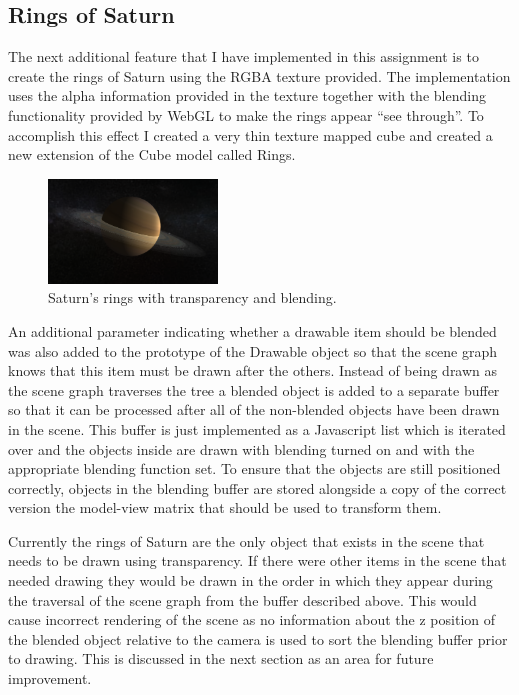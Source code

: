 \documentclass[conference]{IEEEtran}
\begin{document}
\subsection{Rings of Saturn}
The next additional feature that I have implemented in this assignment is to create the rings of Saturn using the RGBA texture provided. The implementation uses the alpha information provided in the texture together with the blending functionality provided by WebGL to make the rings appear ``see through''. To accomplish this effect I created a very thin texture mapped cube and created a new extension of the Cube model called Rings. 

\begin{figure}[!t]
\centering
\includegraphics[width=0.4\textwidth]{img/saturns_rings.png}
\caption{Saturn's rings with transparency and blending.}
\label{fig:saturns-rings}
\end{figure}

An additional parameter indicating whether a drawable item should be blended was also added to the prototype of the Drawable object so that the scene graph knows that this item must be drawn after the others. Instead of being drawn as the scene graph traverses the tree a blended object is added to a separate buffer so that it can be processed after all of the non-blended objects have been drawn in the scene. This buffer is just implemented as a Javascript list which is iterated over and the objects inside are drawn with blending turned on and with the appropriate blending function set. To ensure that the objects are still positioned correctly, objects in the blending buffer are stored alongside a copy of the correct version the model-view matrix that should be used to transform them.

Currently the rings of Saturn are the only object that exists in the scene that needs to be drawn using transparency. If there were other items in the scene that needed drawing they would be drawn in the order in which they appear during the traversal of the scene graph from the buffer described above. This would cause incorrect rendering of the scene as no information about the z position of the blended object relative to the camera is used to sort the blending buffer prior to drawing. This is discussed in the next section as an area for future improvement.
\end{document}
